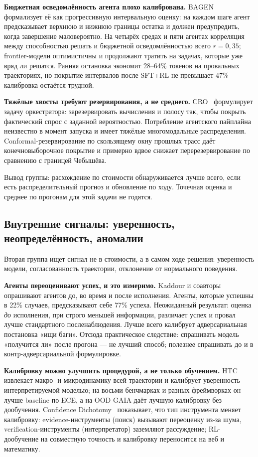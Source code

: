 \documentclass[11pt,a4paper]{article}
\begin{document}
\textbf{Бюджетная осведомлённость агента плохо калибрована.}
BAGEN~\cite{lin2026bagen} формализует её как прогрессивную интервальную
оценку: на каждом шаге агент предсказывает верхнюю и нижнюю границы
остатка и должен предупредить, когда завершение маловероятно. На четырёх
средах и пяти агентах корреляция между способностью решать и бюджетной
осведомлённостью всего $r=0{,}35$; frontier-модели оптимистичны и
продолжают тратить на задачах, которые уже вряд ли решатся. Ранняя
остановка экономит 28--64\% токенов на провальных траекториях, но покрытие
интервалов после SFT+RL не превышает 47\% — калибровка остаётся трудной.

\textbf{Тяжёлые хвосты требуют резервирования, а не среднего.}
CRO~\cite{shokrnezhad2026cro} формулирует задачу оркестратора: зарезервировать
вычисления и полосу так, чтобы покрыть фактический спрос с заданной
вероятностью. Потребление агентского пайплайна неизвестно в момент запуска
и имеет тяжёлые многомодальные распределения. Conformal-резервирование по
скользящему окну прошлых трасс даёт конечновыборочное покрытие и примерно
вдвое снижает перерезервирование по сравнению с границей Чебышёва.

Вывод группы: расхождение по стоимости обнаруживается лучше всего, если
есть распределительный прогноз и обновление по ходу. Точечная оценка и
среднее по прогонам для этой задачи не годятся.

\subsection{Внутренние сигналы: уверенность, неопределённость, аномалии}

Вторая группа ищет сигнал не в стоимости, а в самом ходе решения: уверенность
модели, согласованность траектории, отклонение от нормального поведения.

\textbf{Агенты переоценивают успех, и это измеримо.}
Kaddour и соавторы~\cite{kaddour2026overconfidence} опрашивают агентов до,
во время и после исполнения. Агенты, которые успешны в 22\% случаев,
предсказывают себе 77\% успеха. Неожиданный результат: оценка \emph{до}
исполнения, при строго меньшей информации, различает успех и провал лучше
стандартного посленаблюдения. Лучше всего калибрует адверсариальная постановка
«ищи баги». Отсюда практическое следствие: спрашивать модель «получится
ли» после прогона — не лучший способ; полезнее спрашивать до и в
контр-адверсариальной формулировке.

\textbf{Калибровку можно улучшить процедурой, а не только обучением.}
HTC~\cite{zhang2026htc} извлекает макро- и микродинамику всей траектории и
калибрует уверенность интерпретируемой моделью; на восьми бенчмарках и
разных фреймворках он лучше baseline по ECE, а на OOD GAIA даёт лучшую
калибровку без дообучения. Confidence
Dichotomy~\cite{xuan2026dichotomy} показывает, что тип инструмента меняет
калибровку: evidence-инструменты (поиск) вызывают переоценку из-за шума,
verification-инструменты (интерпретатор) заземляют рассуждение; RL-
дообучение на совместную точность и калибровку переносится на веб и
математику.
\end{document}
